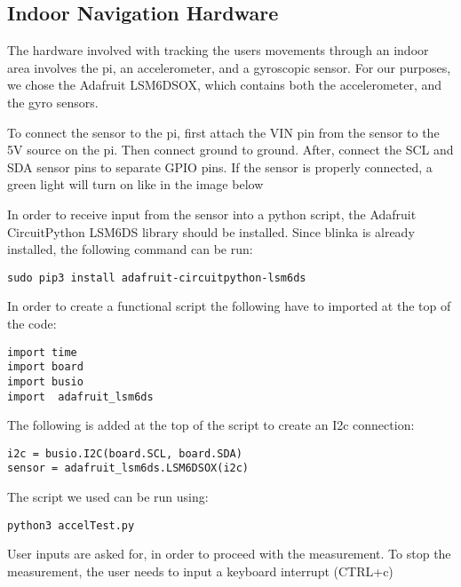 \documentclass[letterpaper,12pt]{article}
\begin{document}
\subsection{Indoor Navigation Hardware}
The hardware involved with tracking the users movements through an indoor area involves the pi, an accelerometer, and a gyroscopic sensor. For our purposes, we chose the Adafruit LSM6DSOX, which contains both the accelerometer, and the gyro sensors. \par
To connect the sensor to the pi, first attach the VIN pin from the sensor to the 5V source on the pi. Then connect ground to ground. After, connect the SCL and SDA sensor pins to separate GPIO pins. If the sensor is properly connected, a green light will turn on like in the image below\par
{}

In order to receive input from the sensor into a python script, the Adafruit CircuitPython LSM6DS library should be installed. Since blinka is already installed, the following command can be run:
\begin{lstlisting}
sudo pip3 install adafruit-circuitpython-lsm6ds

\end{lstlisting}

In order to create a functional script the following have to imported at the top of the code:
\begin{lstlisting}
import time
import board
import busio
import  adafruit_lsm6ds 
\end{lstlisting}

 The following is added at the top of the script to create an I2c connection:
\begin{lstlisting}
i2c = busio.I2C(board.SCL, board.SDA)
sensor = adafruit_lsm6ds.LSM6DSOX(i2c)
\end{lstlisting}

The script we used can be run using:
\begin{lstlisting}
python3 accelTest.py
\end{lstlisting}
User inputs are asked for, in order to proceed with the measurement. To stop the measurement, the user needs to input a keyboard interrupt (CTRL+c)
\end{document}
